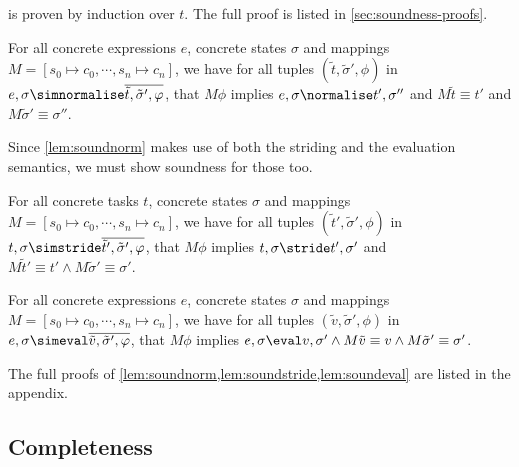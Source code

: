  is proven by induction over $t$.
The full proof is listed in \cref{sec:soundness-proofs}.

\begin{lemma}
  \label{lem:soundnorm}

  For all concrete expressions $e$, concrete states $\sigma$ and mappings $M=[s_0\mapsto c_0,\cdots,s_n\mapsto c_n]$,
  we have for all tuples $(\tilde{t},\tilde{\sigma}',\phi)$ in
  $e,\sigma\simnormalise \overline{\tilde{t},\tilde{\sigma}',\phi}$,
  that $M\phi$ implies
  $e,\sigma \normalise t',\sigma''$ and $M \tilde{t} \equiv t'$ and $M\tilde{\sigma}' \equiv \sigma''$.

\end{lemma}

Since \cref{lem:soundnorm} makes use of both the striding and the evaluation semantics,
we must show soundness for those too.

\begin{lemma}
  \label{lem:soundstride}
  For all concrete tasks $t$, concrete states $\sigma$ and mappings $M=[s_0\mapsto c_0,\cdots,s_n\mapsto c_n]$,
    we have for all tuples $(\tilde{t}',\tilde{\sigma}',\phi)$
    in $t,\sigma\simstride \overline{\tilde{t}',\tilde{\sigma}',\phi}$,
    that $M \phi$ implies
    $t,\sigma \stride t',\sigma'$ and $M \tilde{t}' \equiv t' \land M\tilde{\sigma}' \equiv \sigma'$.

\end{lemma}

\begin{lemma}
  \label{lem:soundeval}

  For all concrete expressions $e$, concrete sta\-tes $\sigma$ and mappings $M=[s_0\mapsto c_0,\cdots,s_n\mapsto c_n]$,
    we have for all tuples $(\tilde{v},\tilde{\sigma}',\phi)$
    in $e,\sigma\simeval \overline{\tilde{v},\tilde{\sigma}',\phi}$,
    that $M\phi$ implies
    $e,\sigma \eval v,\sigma' \land M\tilde{v} \equiv v \wedge M\tilde{\sigma}' \equiv \sigma'$.

\end{lemma}

The full proofs of \cref{lem:soundnorm,lem:soundstride,lem:soundeval} are listed in the appendix.





\subsection{Completeness}

